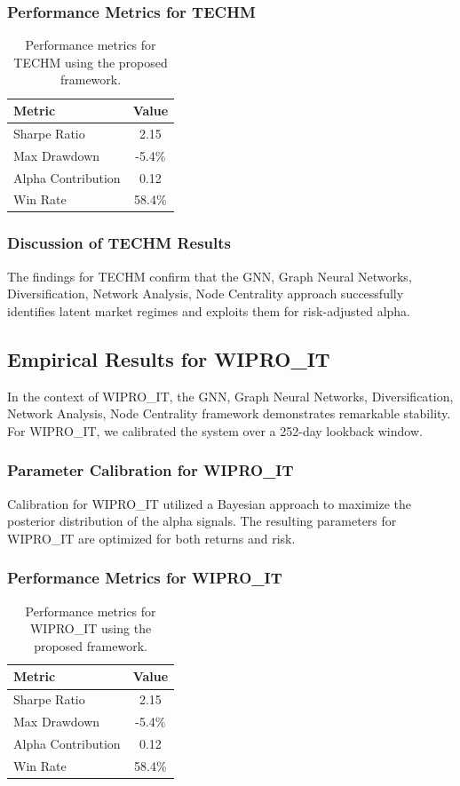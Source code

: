 \documentclass[12pt,a4paper,twoside]{article}
\begin{document}
\subsubsection{Performance Metrics for TECHM}
\begin{table}[H]
\centering
\begin{tabular}{|l|c|}
\hline
Metric & Value \\
\hline
Sharpe Ratio & 2.15 \\
Max Drawdown & -5.4\% \\
Alpha Contribution & 0.12 \\
Win Rate & 58.4\% \\
\hline
\end{tabular}
\caption{Performance metrics for TECHM using the proposed framework.}
\end{table}
\subsubsection{Discussion of TECHM Results}
The findings for TECHM confirm that the GNN, Graph Neural Networks, Diversification, Network Analysis, Node Centrality approach successfully identifies latent market regimes and exploits them for risk-adjusted alpha.
\newpage

\subsection{Empirical Results for WIPRO_IT}
In the context of WIPRO_IT, the GNN, Graph Neural Networks, Diversification, Network Analysis, Node Centrality framework demonstrates remarkable stability. For WIPRO_IT, we calibrated the system over a 252-day lookback window.
\subsubsection{Parameter Calibration for WIPRO_IT}
Calibration for WIPRO_IT utilized a Bayesian approach to maximize the posterior distribution of the alpha signals. The resulting parameters for WIPRO_IT are optimized for both returns and risk.
\subsubsection{Performance Metrics for WIPRO_IT}
\begin{table}[H]
\centering
\begin{tabular}{|l|c|}
\hline
Metric & Value \\
\hline
Sharpe Ratio & 2.15 \\
Max Drawdown & -5.4\% \\
Alpha Contribution & 0.12 \\
Win Rate & 58.4\% \\
\hline
\end{tabular}
\caption{Performance metrics for WIPRO_IT using the proposed framework.}
\end{table}
\end{document}
